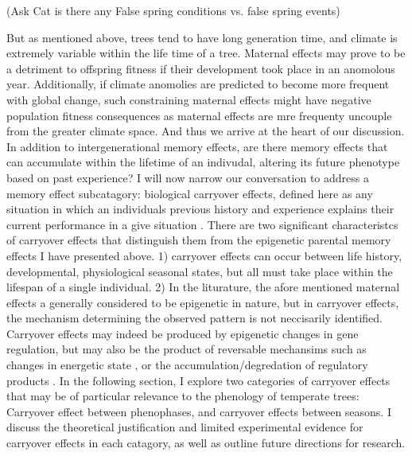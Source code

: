 \documentclass{article}\usepackage[]{graphicx}\usepackage[]{color}
\begin{document}
(Ask Cat is there any False spring conditions vs. false spring events)
\par But as mentioned above, trees tend to have long generation time, and climate is extremely variable within the life time of a tree. Maternal effects may prove to be a detriment to offspring fitness if their development took place in an anomolous year. Additionally, if climate anomolies are predicted to become more frequent with global change, such constraining maternal effects might have negative population fitness consequences as maternal effects are mre frequenty uncouple from the greater climate space. And thus we arrive at the heart of our discussion. In addition to intergenerational memory effects, are there memory effects that can accumulate within the lifetime of an indivudal, altering its future phenotype based on past experience? I will now narrow our conversation to address a memory effect subcatagory: biological carryover effects, defined here as any situation in which an individuals previous history and experience explains their current performance in a give situation \citep{O'Connor2014}. There are two significant characteristcs of carryover effects that distinguish them from the epigenetic parental memory effects I have presented above. 1) carryover effects can occur between life history, developmental, physiological seasonal states, but all must take place within the lifespan of a single individual. 2) In the liturature, the afore mentioned maternal effects a generally considered to be epigenetic in nature, but in carryover effects, the mechanism determining the observed pattern is not neccisarily identified. Carryover effects may indeed be produced by epigenetic changes in gene regulation, but may also be the product of reversable mechansims such as changes in energetic state \citep{O'Connor2014}, or the accumulation/degredation of regulatory products \citep{Gomory2015}. In the following section, I explore two categories of carryover effects that may be of particular relevance to the phenology of temperate trees: Carryover effect between phenophases, and carryover effects between seasons. I discuss the theoretical justification and limited experimental evidence for carryover effects in each catagory, as well as outline future directions for research.
\end{document}
